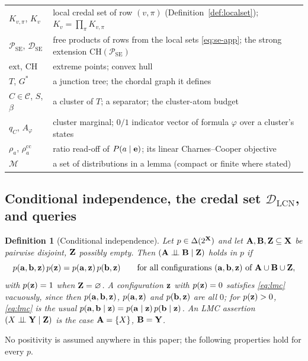 \documentclass{article} %
\newtheorem{definition}{Definition}
\newcommand{\indep}{\perp\!\!\!\perp}
\newcommand{\DSE}{\mathcal{D}_{\mathrm{SE}}}
\newcommand{\DLCN}{\mathcal{D}_{\mathrm{LCN}}}
\newcommand{\readoff}{\rho}
\newcommand{\ext}{\mathrm{ext}}
\providecommand{\readoffcc}{\readoff^{\mathrm{cc}}}
\begin{document}
\begin{table}[h]
\begin{tabularx}{\linewidth}{@{}l X@{}}
$K_{v,\pi}$, $K_v$ & local credal set of row $(v,\pi)$ (Definition~\ref{def:localset}); $K_v=\prod_\pi K_{v,\pi}$\\
$\mathcal P_{\mathrm{SE}}$, $\DSE$ & free products of rows from the local sets \eqref{eq:se-app}; the strong extension $\mathrm{CH}(\mathcal P_{\mathrm{SE}})$\\
$\ext$, $\mathrm{CH}$ & extreme points; convex hull\\
$T$, $G^\ast$ & a junction tree; the chordal graph it defines\\
$C\in\mathcal C$, $S$, $\beta$ & a cluster of $T$; a separator; the cluster-atom budget\\
$q_C$, $A_\varphi$ & cluster marginal; $0/1$ indicator vector of formula $\varphi$ over a cluster's states\\
$\readoff_a$, $\readoffcc_a$ & ratio read-off of $P(a\mid\mathbf{e})$; its linear Charnes--Cooper objective\\
$\mathcal M$ & a set of distributions in a lemma (compact or finite where stated)\\
\bottomrule
\end{tabularx}
\end{table}

\subsection{Conditional independence, the credal set \texorpdfstring{$\DLCN$}{D\_LCN}, and queries}\label{sec:prelim-dlcn}

\begin{definition}[Conditional independence]\label{def:ci}
Let $p\in\Delta(2^{\mathbf{X}})$ and let $\mathbf{A},\mathbf{B},\mathbf{Z}\subseteq\mathbf{X}$ be pairwise disjoint,
$\mathbf{Z}$ possibly empty. Then $(\bA\indep\bB\mid\bZ)$ \emph{holds in} $p$ if
\begin{equation}\label{eq:lmc}
  p(\mathbf{a},\mathbf{b},\mathbf{z})\,p(\mathbf{z})=p(\mathbf{a},\mathbf{z})\,p(\mathbf{b},\mathbf{z})
  \qquad\text{for all configurations }(\mathbf{a},\mathbf{b},\mathbf{z})\text{ of }\mathbf{A}\cup\mathbf{B}\cup\mathbf{Z},
\end{equation}
with $p(\mathbf{z})=1$ when $\mathbf{Z}=\varnothing$. A configuration $\mathbf{z}$ with $p(\mathbf{z})=0$
satisfies \eqref{eq:lmc} vacuously, since then $p(\mathbf{a},\mathbf{b},\mathbf{z})$, $p(\mathbf{a},\mathbf{z})$ and
$p(\mathbf{b},\mathbf{z})$ are all $0$; for $p(\mathbf{z})>0$, \eqref{eq:lmc} is the usual
$p(\mathbf{a},\mathbf{b}\mid\mathbf{z})=p(\mathbf{a}\mid\mathbf{z})\,p(\mathbf{b}\mid\mathbf{z})$. An LMC assertion
$(X\indep\bY\mid\bZ)$ is the case $\mathbf{A}=\{X\}$, $\mathbf{B}=\mathbf{Y}$.
\end{definition}

No positivity is assumed anywhere in this paper; the following properties hold
for every $p$.
\end{document}
